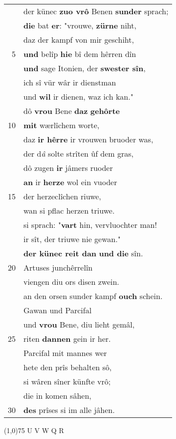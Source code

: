 \documentclass[8pt,a4paper,notitlepage]{article}
\begin{document}
\begin{table}[ht]
\begin{minipage}[t]{0.5\linewidth}
\begin{tabular}{rl}
 & der künec \textbf{zuo vrô} Benen \textbf{sunder} sprach;\\ 
 & \textbf{die} bat \textbf{er}: "vrouwe, \textbf{zürne} niht,\\ 
 & daz der kampf von mir geschiht,\\ 
5 & \textbf{und} belîp \textbf{hie} bî dem hêrren dîn\\ 
 & \textbf{und} sage Itonien, der \textbf{swester sîn},\\ 
 & ich sî vür wâr ir dienstman\\ 
 & und \textbf{wil} ir dienen, waz ich kan."\\ 
 & dô \textbf{vrou} Bene \textbf{daz} \textbf{gehôrte}\\ 
10 & \textbf{mit} wærlîchem worte,\\ 
 & daz \textbf{ir hêrre} ir vrouwen bruoder was,\\ 
 & der d\textit{â} solte strîten ûf dem gras,\\ 
 & dô zugen \textbf{ir} jâmers ruoder\\ 
 & \textbf{an} ir \textbf{herze} wol ein vuoder\\ 
15 & der herzeclîchen riuwe,\\ 
 & wan si pflac herzen triuwe.\\ 
 & si sprach: "\textbf{vart} hin, vervluochter man!\\ 
 & ir sît, der triuwe nie gewan."\\ 
 & \textbf{der künec reit dan} \textbf{und die} sîn.\\ 
20 & Artuses junchêrrelîn\\ 
 & viengen diu ors disen zwein.\\ 
 & an den orsen sunder kampf \textbf{ouch} schein.\\ 
 & Gawan und Parcifal\\ 
 & und \textbf{vrou} Bene, diu lieht gemâl,\\ 
25 & riten \textbf{dannen} gein ir her.\\ 
 & Parcifal mit mannes wer\\ 
 & hete den prîs behalten sô,\\ 
 & si wâren sîner künfte vrô;\\ 
 & die in komen sâhen,\\ 
30 & \textbf{des} prîses si im alle jâhen.\\ 
\end{tabular}
\scriptsize
\line(1,0){75} \newline
U V W Q R \newline

\end{minipage}
\end{table}
\end{document}
